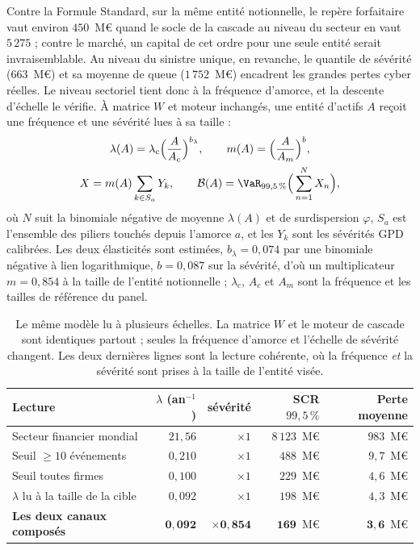 Contre la Formule Standard, sur la même entité notionnelle, le repère forfaitaire vaut environ
$450$~M\euro{} quand le socle de la cascade au niveau du secteur en vaut $5\,275$ ; contre le
marché, un capital de cet ordre pour une seule entité serait invraisemblable. Au niveau du
sinistre unique, en revanche, le quantile de sévérité ($663$~M\euro) et sa moyenne de queue
($1\,752$~M\euro) encadrent les grandes pertes cyber réelles. Le niveau sectoriel tient donc à la
fréquence d'amorce, et la descente d'échelle le vérifie. À matrice $W$ et moteur inchangés, une
entité d'actifs $A$ reçoit une fréquence et une sévérité lues à sa taille :
\begin{equation}%
\begin{gathered}
\lambda(A)=\lambda_c\Big(\frac{A}{A_c}\Big)^{b_\lambda},\qquad
m(A)=\Big(\frac{A}{A_m}\Big)^{b},\\
X=m(A)\sum_{k\in S_a}Y_k,\qquad
\mathcal{B}(A)=\VaR_{99{,}5\,\%}\Big(\sum_{n=1}^{N}X_n\Big),
\end{gathered}
\end{equation}
où $N$ suit la binomiale négative de moyenne $\lambda(A)$ et de surdispersion $\varphi$, $S_a$ est
l'ensemble des piliers touchés depuis l'amorce $a$, et les $Y_k$ sont les sévérités GPD calibrées.
Les deux élasticités sont estimées, $b_\lambda = 0{,}074$ par une binomiale négative à lien
logarithmique, $b = 0{,}087$ sur la sévérité, d'où un multiplicateur $m = 0{,}854$ à la taille de
l'entité notionnelle ; $\lambda_c$, $A_c$ et $A_m$ sont la fréquence et les tailles de référence du
panel.

\begin{table}[htbp]\centering
\small
\begin{tabular}{lrrrr}
\toprule
Lecture & $\lambda$ (an$^{-1}$) & sévérité & SCR $99{,}5\,\%$ & Perte moyenne \\
\midrule
Secteur financier mondial & $21{,}56$ & $\times 1$ & $8\,123$~M\euro & $983$~M\euro \\
Seuil \og{}$\geq 10$ événements\fg{} & $0{,}210$ & $\times 1$ & $488$~M\euro & $9{,}7$~M\euro \\
Seuil \og{}toutes firmes\fg{} & $0{,}100$ & $\times 1$ & $229$~M\euro & $4{,}6$~M\euro \\
$\lambda$ lu à la taille de la cible & $0{,}092$ & $\times 1$ & $198$~M\euro & $4{,}3$~M\euro \\
\textbf{Les deux canaux composés} & $\mathbf{0{,}092}$ & $\mathbf{\times 0{,}854}$ &
$\mathbf{169}$~M\euro & $\mathbf{3{,}6}$~M\euro \\
\bottomrule
\end{tabular}
\caption{Le même modèle lu à plusieurs échelles. La matrice $W$ et le moteur de cascade sont
identiques partout ; seules la fréquence d'amorce et l'échelle de sévérité changent. Les deux
dernières lignes sont la lecture cohérente, où la fréquence \emph{et} la sévérité sont prises
à la taille de l'entité visée.}
\end{table}

